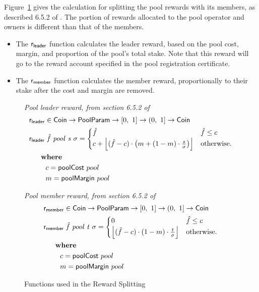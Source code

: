 \clearpage

Figure~\ref{fig:functions:reward-splitting} gives the calculation for
splitting the pool rewards with its members, as described 6.5.2 of \cite{delegation_design}.
The portion of rewards allocated to the pool operator and owners is different
than that of the members.

\begin{itemize}
  \item The $\fun{r_{leader}}$ function calculates the leader reward, based on the pool cost,
    margin, and proportion of the pool's total stake.  Note that this reward will go to the
    reward account specified in the pool registration certificate.
  \item The $\fun{r_{member}}$ function calculates the member reward, proportionally to their
    stake after the cost and margin are removed.
\end{itemize}

\begin{figure}[htb]
  \emph{Pool leader reward, from section 6.5.2 of \cite{delegation_design}}
  \begin{align*}
      & \fun{r_{leader}} \in \Coin \to \PoolParam \to \unitInterval \to \unitIntervalNonNull \to \Coin \\
      & \lReward{\hat{f}}{pool}{s}{\sigma} =
        \begin{cases}
        \hat{f} & \hat{f} \leq c\\
        c + \floor*{(\hat{f} - c)\cdot\left(m + (1-m)\cdot\frac{s}{\sigma}\right) }&
        \text{otherwise.}
      \end{cases} \\
      & ~~~\where \\
      & ~~~~~~~c = \fun{poolCost}~pool \\
      & ~~~~~~~m = \fun{poolMargin}~pool \\
  \end{align*}

  \emph{Pool member reward, from section 6.5.2 of \cite{delegation_design}}
  \begin{align*}
    & \fun{r_{member}} \in \Coin \to \PoolParam \to \unitInterval \to \unitIntervalNonNull \to \Coin \\
    & \mReward{\hat{f}}{pool}{t}{\sigma} =
      \begin{cases}
        0 & \hat{f} \leq c\\
        \floor*{(\hat{f} - c)\cdot(1-m)\cdot\frac{t}{\sigma}} &
        \text{otherwise.}
      \end{cases} \\
    & ~~~\where \\
    & ~~~~~~~c = \fun{poolCost}~pool \\
    & ~~~~~~~m = \fun{poolMargin}~pool \\
  \end{align*}

  \caption{Functions used in the Reward Splitting}
  \label{fig:functions:reward-splitting}
\end{figure}


